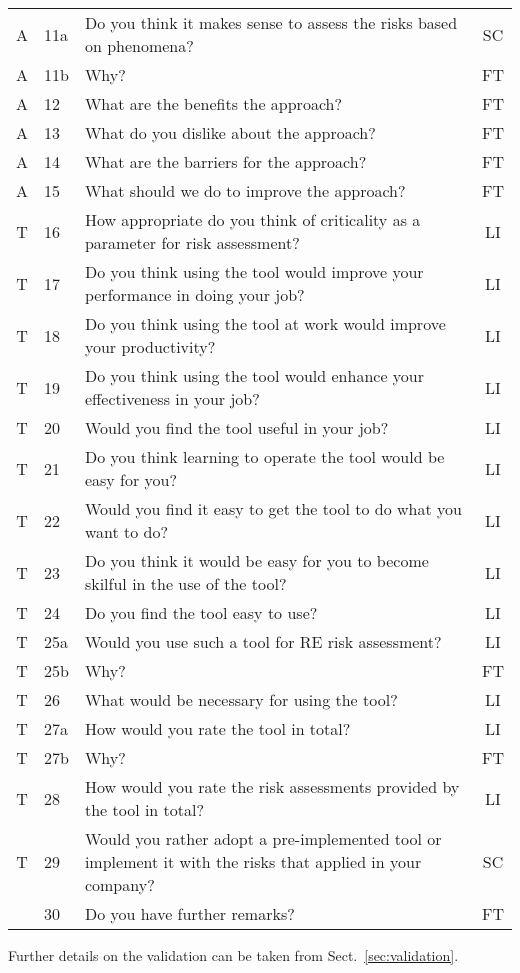 \documentclass[lnbip]{svmultln}
\begin{document}
\begin{table}[htb]
\begin{tabular}{clp{10.4cm}c}
	A & 11a &  Do you think it makes sense to assess the risks based on phenomena? & SC  \\ 
	A & 11b & Why?  &  FT \\ 
	A & 12 & What are the benefits the approach?  &  FT \\ 
	A & 13 & What do you dislike about the approach?  &  FT \\ 
	A & 14 &  What are the barriers for the approach? &  FT \\ 
	A & 15 &  What should we do to improve the approach?  & FT  \\ 
	\midrule
	T & 16 & How appropriate do you think of criticality as a parameter for risk assessment?  & LI  \\ 
	T & 17 & Do you think using the tool would improve your performance in doing your job?  & LI  \\ 
	T & 18 & Do you think using the tool at work would improve your productivity? &  LI \\ 
	T & 19 & Do you think using the tool would enhance your effectiveness in your job? & LI  \\ 
	T & 20 & Would you find the tool useful in your job? & LI  \\ 
	T & 21 & Do you think learning to operate the tool would be easy for you?  & LI  \\ 
	T & 22 & Would you find it easy to get the tool to do what you want to do? &  LI \\ 
	T & 23 & Do you think it would be easy for you to become skilful in the use of the tool?  & LI  \\ 
	T & 24 & Do you find the tool easy to use? & LI  \\ 
	T & 25a & Would you use such a tool for RE risk assessment?  &  LI \\ 
	T & 25b & Why?  & FT  \\ 
	T & 26 & What would be necessary for using the tool?  & LI  \\ 
	T & 27a & How would you rate the tool in total?  &  LI \\ 
	T & 27b & Why?  & FT  \\ 
	T & 28 & How would you rate the risk assessments provided by the tool in total?   & LI  \\ 
	T & 29 & Would you rather adopt a pre-implemented tool or implement it with the risks that applied in your company?   & SC  \\ 
	 & 30 & Do you have further remarks?  &  FT \\ 
	\bottomrule
\end{tabular}
\end{table}
Further details on the validation can be taken from Sect.~\ref{sec:validation}.
\end{document}
